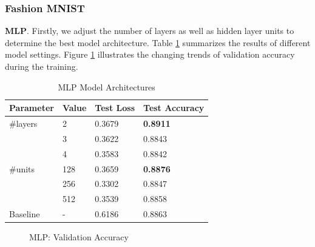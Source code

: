 \documentclass{article}
\begin{document}
\subsubsection{Fashion MNIST}
\textbf{MLP}. Firstly, we adjust the number of layers as well as hidden layer units to determine the best model architecture. Table \ref{tab:1-ma-mnist} summarizes the results of different model settings. Figure \ref{fig:1-mlp-arch} illustrates the changing trends of validation accuracy during the training.
\begin{table}[!ht]
    \centering
    \caption{MLP Model Architectures}
    \label{tab:1-ma-mnist}
    \begin{tabular}{llll}
        \toprule
        \textbf{Parameter} & \textbf{Value} & \textbf{Test Loss} & \textbf{Test Accuracy}\\
        \midrule
        \#layers & 2 & 0.3679 & \textbf{0.8911}\\
                 & 3 & 0.3622 & 0.8843\\
                 & 4 & 0.3583 & 0.8842\\
        \midrule
        \#units & 128 & 0.3659 & \textbf{0.8876}\\
                & 256 & 0.3302 & 0.8847\\
                & 512 & 0.3539 & 0.8858\\
        \midrule
        Baseline & - & 0.6186 & 0.8863\\
        \bottomrule
    \end{tabular}
\end{table}
\begin{figure}[!ht]
    \centering
        \hspace{1cm}
    \caption{MLP: Validation Accuracy}
    \label{fig:1-mlp-arch}
\end{figure}
\end{document}

